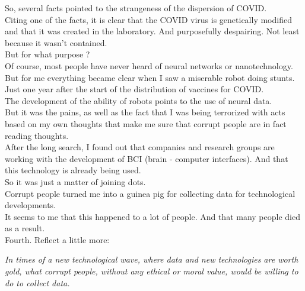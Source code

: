 \documentclass[11pt]{book}
\begin{document}
\noindent So, several facts pointed to the strangeness of the dispersion of COVID. \\

\noindent Citing one of the facts, it is clear that the COVID virus is genetically modified and that it was created in the laboratory. And purposefully despairing. Not least because it wasn't contained. \\

\noindent But for what purpose ? \\

\noindent Of course, most people have never heard of neural networks or nanotechnology. \\

\noindent But for me everything became clear when I saw a miserable robot doing stunts. Just one year after the start of the distribution of vaccines for COVID. \\

\noindent The development of the ability of robots points to the use of neural data. \\

\noindent But it was the pains, as well as the fact that I was being terrorized with acts based on my own thoughts that make me sure that corrupt people are in fact reading thoughts. \\

\noindent After the long search, I found out that companies and research groups are working with the development of BCI (brain - computer interfaces). And that this technology is already being used. \\

\noindent So it was just a matter of joining dots. \\

\noindent Corrupt people turned me into a guinea pig for collecting data for technological developments. \\

\noindent It seems to me that this happened to a lot of people. And that many people died as a result. \\

\noindent Fourth. Reflect a little more:

\noindent \begin{center} \emph{In times of a new technological wave, where data and new technologies are worth gold, what corrupt people, without any ethical or moral value, would be willing to do to collect data.} \end{center}
\end{document}
